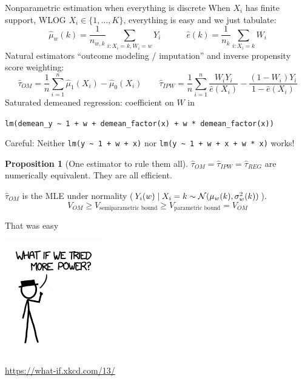 \documentclass[10pt,aspectratio=169,handout]{beamer}
\theoremstyle{definition}
\newtheorem{prop}{Proposition}
\begin{document}
\begin{frame}{Nonparametric estimation when everything is discrete}
\small
  When $X_i$ has finite support, WLOG $X_i \in \{1,\ldots,K\}$, everything
  is easy and we just tabulate: \[
  \hat \mu_w(k) = \frac{1}{n_{w,k}}\sum_{i: X_i=k, W_i=w} Y_i
  \quad\quad\quad \hat e
  (k) = \frac{1}{n_k}\sum_{i:X_i = k}  W_i
  \]
Natural estimators ``\alert{outcome modeling / imputation}'' and 
\alert{inverse
propensity
score weighting}:
\[
\hat \tau_{OM} = \frac{1}{n}\sum_{i=1}^n \hat \mu_1(X_i) - \hat \mu_0 (X_i)
\qquad \hat \tau_{IPW} = \frac{1}{n}\sum_{i=1}^n \frac{W_i Y_i}{\hat e(X_i)} - 
\frac{(1-W_i) Y_i}{1-\hat e(X_i)}
\]
\alert{Saturated demeaned regression}: coefficient on $W$ in  

\texttt{lm(demean\_y \textasciitilde{} 1 + w + demean\_factor(x) + 
\alert{w *
demean\_factor(x))}}

\hfill{\footnotesize\alert{Careful: Neither \texttt{lm(y \textasciitilde{}
1 + w +
x)} nor \texttt{lm(y
\textasciitilde{}
1 + w + x + w * x)} works!}}

\begin{prop}[One estimator to rule them all]
  $\hat\tau_{OM} = \hat\tau_{IPW} = \hat\tau_{REG}$ are numerically
  equivalent. They are all efficient.
  
  $\hat \tau_{OM}$ is the MLE under normality
  ($Y_i(w) \mid X_i = k \sim \mathcal{N}(\mu_{w}(k), \sigma^2_
  {w}(k))$). 
  \[
  V_{OM} \ge V_{\text{semiparametric bound}} \ge V_{\text{parametric
  bound}} =
  V_{OM}
  \]
\end{prop}
\end{frame}

\begin{frame}{That was easy}
\begin{center}
  \includegraphics[height=0.3\textheight]{laser_pointer_more_power.png}
  
  \url{https://what-if.xkcd.com/13/}
\end{center}
  
\end{frame}
\end{document}
